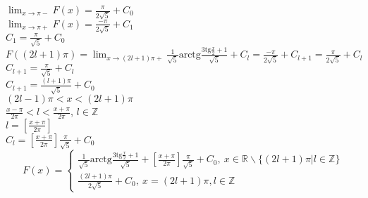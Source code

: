 \documentclass{article}
\begin{document}
$\displaystyle{\lim_{x\to\pi-} F(x)} = \frac{\pi}{2\sqrt{5}}+C_0$\\
$\displaystyle{\lim_{x\to\pi+} F(x)} = \frac{-\pi}{2\sqrt{5}}+C_1$\\
$C_1 = \frac{\pi}{\sqrt{5}} +C_0$\\
$F((2l+1)\pi) = \displaystyle{\lim_{x\to(2l+1)\pi+}}\frac{1}{\sqrt{5}}\text{arctg}\frac{3\text{tg}\frac{x}{2}+1}{\sqrt{5}}+C_l = \frac{-\pi}{2\sqrt{5}} + C_{l+1} = \frac{\pi}{2\sqrt{5}}+C_l$\\
$C_{l+1} = \frac{\pi}{\sqrt{5}} + C_l$\\
$C_{l+1} = \frac{(l+1)\pi}{\sqrt{5}} + C_0$\\
$(2l-1)\pi < x < (2l+1)\pi$\\
$\frac{x-\pi}{2\pi} < l < \frac{x+\pi}{2\pi}$, $l \in \mathbb{Z}$\\
$l = [\frac{x+\pi}{2\pi}]$\\
$C_l = [\frac{x+\pi}{2\pi}]\frac{\pi}{\sqrt{5}} + C_0$\\
$$
    F(x) =
    \begin{cases}
        \frac{1}{\sqrt{5}}\text{arctg}\frac{3\text{tg}\frac{x}{2}+1}{\sqrt{5}} + [\frac{x+\pi}{2\pi}]\frac{\pi}{\sqrt{5}} + C_0,\ x \in \mathbb{R}\backslash\{(2l+1)\pi | l \in \mathbb{Z}\} \\
        \frac{(2l+1)\pi}{2\sqrt{5}}+C_0,\ x = (2l+1)\pi, l\in\mathbb{Z}
    \end{cases}
$$
\end{document}
